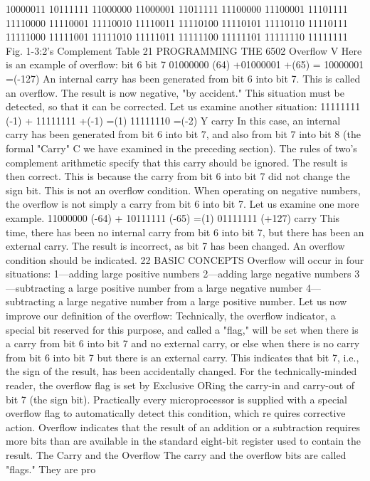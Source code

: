 10000011
10111111
11000000
11000001
11011111
11100000
11100001
11101111
11110000
11110001
11110010
11110011
11110100
11110101
11110110
11110111
11111000
11111001
11111010
11111011
11111100
11111101
11111110
11111111
Fig. 1-3:2's Complement Table
21
PROGRAMMING THE 6502
Overflow V
Here is an example of overflow:
bit 6
bit 7
01000000 (64)
+01000001 +(65)
= 10000001 =(-127)
An internal carry has been generated from bit 6 into bit 7. This is
called an overflow.
The result is now negative, "by accident." This situation must
be detected, so that it can be corrected.
Let us examine another situation:
11111111 (-1)
+ 11111111 +(-1)
=(1) 11111110 =(-2)
Y
carry
In this case, an internal carry has been generated from bit 6 into
bit 7, and also from bit 7 into bit 8 (the formal "Carry" C we have
examined in the preceding section). The rules of two's complement
arithmetic specify that this carry should be ignored. The result is
then correct.
This is because the carry from bit 6 into bit 7 did not change the
sign bit.
This is not an overflow condition. When operating on negative
numbers, the overflow is not simply a carry from bit 6 into bit 7.
Let us examine one more example.
11000000 (-64)
+ 10111111 (-65)
=(1) 01111111 (+127)
carry
This time, there has been no internal carry from bit 6 into bit 7, but
there has been an external carry. The result is incorrect, as bit 7
has been changed. An overflow condition should be indicated.
22
BASIC CONCEPTS
Overflow will occur in four situations:
1—adding large positive numbers
2—adding large negative numbers
3—subtracting a large positive number from a large negative
number
4—subtracting a large negative number from a large positive
number.
Let us now improve our definition of the overflow:
Technically, the overflow indicator, a special bit reserved for this
purpose, and called a "flag," will be set when there is a carry from
bit 6 into bit 7 and no external carry, or else when there is no carry
from bit 6 into bit 7 but there is an external carry. This indicates
that bit 7, i.e., the sign of the result, has been accidentally
changed. For the technically-minded reader, the overflow flag is
set by Exclusive ORing the carry-in and carry-out of bit 7 (the sign
bit). Practically every microprocessor is supplied with a special
overflow flag to automatically detect this condition, which re
quires corrective action.
Overflow indicates that the result of an addition or a subtraction
requires more bits than are available in the standard eight-bit
register used to contain the result.
The Carry and the Overflow
The carry and the overflow bits are called "flags." They are pro
